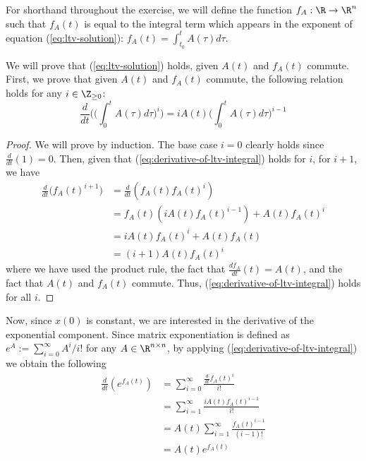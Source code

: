 \documentclass{homework}
\begin{document}
For shorthand throughout the exercise, we will define the function
$f_A: \R \to \R^n$ such that $f_A(t)$ is equal
to the integral term which appears in the exponent of equation (\ref{eq:ltv-solution}):
$f_A(t) = \int_{t_0}^{t} A(\tau) d\tau$.

We will prove that (\ref{eq:ltv-solution}) holds, given $A(t)$ and $f_A(t)$ commute.
First, we prove that given $A(t)$ and $f_A(t)$
commute, the following relation holds for any $i\in\Z_{\geq0}$:
\begin{equation}
    \frac{d}{dt} \biggl(
        \biggl(
            \int_0^t A(\tau) d\tau
        \biggr)^i
    \biggr) = i A(t) \biggl(\int_{0}^{t} A(\tau) d\tau\biggr)^{i-1}
    \label{eq:derivative-of-ltv-integral}
\end{equation}

\begin{proof}
    We will prove by induction. The base case $i=0$ clearly holds since
    $\frac{d}{dt}(1) = 0$.  Then, given that (\ref{eq:derivative-of-ltv-integral})
    holds for $i$, for $i+1$, we have
    \begin{align*}
        \frac{d}{dt} \biggl(
            f_A(t)^{i+1}
        \biggr)
        &= \frac{d}{dt} (f_A(t) f_A(t)^i) \\
        &= f_A(t) (i A(t) f_A(t)^{i-1}) + A(t) f_A(t)^{i} \\
        &= i A(t) f_A(t)^{i} + A(t) f_A(t) \\
        &= (i + 1) A(t) f_A(t)^{i}
    \end{align*}
    where we have used the product rule, the fact that $\frac{df_A}{dt}(t) = A(t)$,
    and the fact that $A(t)$ and $f_A(t)$ commute.
    Thus, (\ref{eq:derivative-of-ltv-integral})
    holds for all $i$.
\end{proof}

Now, since $x(0)$ is
constant, we are interested in the derivative of the exponential component.
Since matrix exponentiation is defined as $e^A := \sum_{i=0}^{\infty} A^i / i!$
for any $A \in \R^{n \times n}$, by applying (\ref{eq:derivative-of-ltv-integral})
we obtain the following
\begin{align*}
    \frac{d}{dt} (e^{f_A(t)}) &= \sum_{i=0}^{\infty} \frac{\frac{d}{dt} f_A(t)^i}{i!} \\
        &= \sum_{i=1}^{\infty} \frac{i A(t) f_A(t)^{i-1}}{i!} \\
        &= A(t) \sum_{i=1}^{\infty} \frac{f_A(t)^{i-1}}{(i-1)!} \\
        &= A(t) e^{f_A(t)}
\end{align*}
\end{document}

